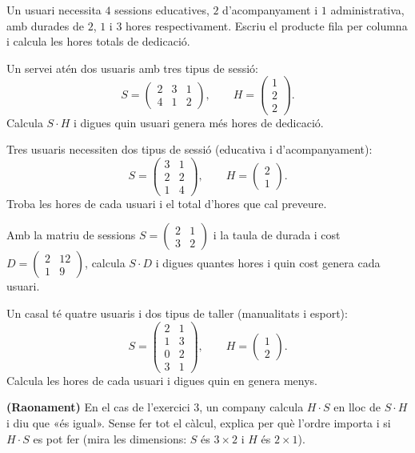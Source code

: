 \begin{exercicis}
\begin{exlist}
  \item Un usuari necessita $4$ sessions educatives, $2$ d'acompanyament i $1$
        administrativa, amb durades de $2$, $1$ i $3$ hores respectivament. Escriu
        el producte fila per columna i calcula les hores totals de dedicació.
  \item Un servei atén dos usuaris amb tres tipus de sessió:
        \[ S=\begin{pmatrix} 2 & 3 & 1 \\ 4 & 1 & 2 \end{pmatrix},\qquad
           H=\begin{pmatrix} 1 \\ 2 \\ 2 \end{pmatrix}. \]
        Calcula $S\cdot H$ i digues quin usuari genera més hores de dedicació.
  \item Tres usuaris necessiten dos tipus de sessió (educativa i d'acompanyament):
        \[ S=\begin{pmatrix} 3 & 1 \\ 2 & 2 \\ 1 & 4 \end{pmatrix},\qquad
           H=\begin{pmatrix} 2 \\ 1 \end{pmatrix}. \]
        Troba les hores de cada usuari i el total d'hores que cal preveure.
  \item Amb la matriu de sessions $S=\begin{pmatrix} 2 & 1 \\ 3 & 2 \end{pmatrix}$
        i la taula de durada i cost $D=\begin{pmatrix} 2 & 12 \\ 1 & 9 \end{pmatrix}$,
        calcula $S\cdot D$ i digues quantes hores i quin cost genera cada usuari.
  \item Un casal té quatre usuaris i dos tipus de taller (manualitats i esport):
        \[ S=\begin{pmatrix} 2 & 1 \\ 1 & 3 \\ 0 & 2 \\ 3 & 1 \end{pmatrix},\qquad
           H=\begin{pmatrix} 1 \\ 2 \end{pmatrix}. \]
        Calcula les hores de cada usuari i digues quin en genera menys.
  \item \textbf{(Raonament)} En el cas de l'exercici 3, un company calcula
        $H\cdot S$ en lloc de $S\cdot H$ i diu que «és igual». Sense fer tot el
        càlcul, explica per què l'ordre importa i si $H\cdot S$ es pot fer (mira
        les dimensions: $S$ és $3\times 2$ i $H$ és $2\times 1$).
\end{exlist}
\end{exercicis}

